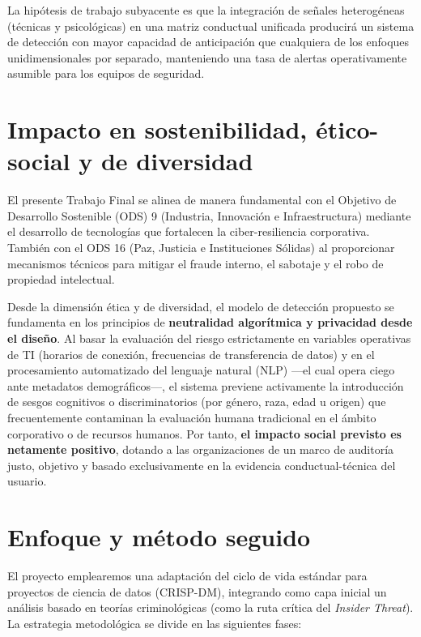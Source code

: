 \documentclass[IB]{TFUOC}%
\begin{document}
\noindent La hipótesis de trabajo subyacente es que la integración de señales heterogéneas (técnicas y psicológicas) en una matriz conductual unificada producirá un sistema de detección con mayor capacidad de anticipación que cualquiera de los enfoques unidimensionales por separado, manteniendo una tasa de alertas operativamente asumible para los equipos de seguridad.

\section{Impacto en sostenibilidad, ético-social y de diversidad}
\label{s:etic}

El presente Trabajo Final se alinea de manera fundamental con el Objetivo de Desarrollo Sostenible (ODS) 9 (Industria, Innovación e Infraestructura) mediante el desarrollo de tecnologías que fortalecen la ciber-resiliencia corporativa. También con el ODS 16 (Paz, Justicia e Instituciones Sólidas) al proporcionar mecanismos técnicos para mitigar el fraude interno, el sabotaje y el robo de propiedad intelectual.

\medskip
\noindent Desde la dimensión ética y de diversidad, el modelo de detección propuesto se fundamenta en los principios de \textbf{neutralidad algorítmica y privacidad desde el diseño}. Al basar la evaluación del riesgo estrictamente en variables operativas de TI (horarios de conexión, frecuencias de transferencia de datos) y en el procesamiento automatizado del lenguaje natural (NLP) —el cual opera ciego ante metadatos demográficos—, el sistema previene activamente la introducción de sesgos cognitivos o discriminatorios (por género, raza, edad u origen) que frecuentemente contaminan la evaluación humana tradicional en el ámbito corporativo o de recursos humanos. Por tanto,\textbf{ el impacto social previsto es netamente positivo}, dotando a las organizaciones de un marco de auditoría justo, objetivo y basado exclusivamente en la evidencia conductual-técnica del usuario.


\section{Enfoque y método seguido}

El proyecto emplearemos una adaptación del ciclo de vida estándar para proyectos de ciencia de datos (CRISP-DM), integrando como capa inicial un análisis basado en teorías criminológicas (como la ruta crítica del \textit{Insider Threat}). La estrategia metodológica se divide en las siguientes fases:
\end{document}
